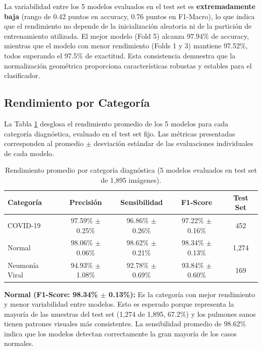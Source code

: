 La variabilidad entre los 5 modelos evaluados en el test set es \textbf{extremadamente baja} (rango de 0.42 puntos en accuracy, 0.76 puntos en F1-Macro), lo que indica que el rendimiento no depende de la inicialización aleatoria ni de la partición de entrenamiento utilizada. El mejor modelo (Fold 5) alcanza 97.94\% de accuracy, mientras que el modelo con menor rendimiento (Folds 1 y 3) mantiene 97.52\%, todos superando el 97.5\% de exactitud. Esta consistencia demuestra que la normalización geométrica proporciona características robustas y estables para el clasificador.

\subsection{Rendimiento por Categoría}
\label{subsec:rendimiento_por_clase}

La Tabla \ref{tab:metricas_por_clase} desglosa el rendimiento promedio de los 5 modelos para cada categoría diagnóstica, evaluado en el test set fijo. Las métricas presentadas corresponden al promedio $\pm$ desviación estándar de las evaluaciones individuales de cada modelo.

\begin{table}[htbp]
    \centering
    \caption{Rendimiento promedio por categoría diagnóstica (5 modelos evaluados en test set de 1,895 imágenes).}
    \label{tab:metricas_por_clase}
    \small
    \begin{tabular}{@{}lcccc@{}}
        \toprule
        \textbf{Categoría} & \textbf{Precisión} & \textbf{Sensibilidad} & \textbf{F1-Score} & \textbf{Test Set} \\
        \midrule
        COVID-19 & 97.59\% $\pm$ 0.25\% & 96.86\% $\pm$ 0.26\% & 97.22\% $\pm$ 0.16\% & 452 \\
        Normal & 98.06\% $\pm$ 0.06\% & 98.62\% $\pm$ 0.21\% & 98.34\% $\pm$ 0.13\% & 1,274 \\
        Neumonía Viral & 94.93\% $\pm$ 1.08\% & 92.78\% $\pm$ 0.69\% & 93.84\% $\pm$ 0.60\% & 169 \\
        \bottomrule
    \end{tabular}
\end{table}

\textbf{Normal (F1-Score: 98.34\% $\pm$ 0.13\%):} Es la categoría con mejor rendimiento y menor variabilidad entre modelos. Esto es esperado porque representa la mayoría de las muestras del test set (1,274 de 1,895, 67.2\%) y los pulmones sanos tienen patrones visuales más consistentes. La sensibilidad promedio de 98.62\% indica que los modelos detectan correctamente la gran mayoría de los casos normales.

